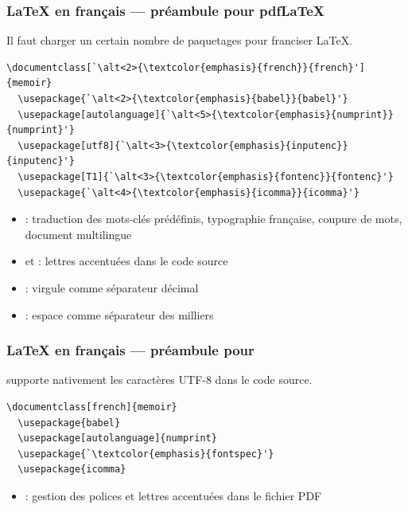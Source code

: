 \begin{frame}[fragile]
  \frametitle{{\LaTeX} en français --- préambule pour pdf{\LaTeX}}

  Il faut charger un certain nombre de paquetages pour franciser \LaTeX.
\begin{lstlisting}
\documentclass[`\alt<2>{\textcolor{emphasis}{french}}{french}']{memoir}
  \usepackage{`\alt<2>{\textcolor{emphasis}{babel}}{babel}'}
  \usepackage[autolanguage]{`\alt<5>{\textcolor{emphasis}{numprint}}{numprint}'}
  \usepackage[utf8]{`\alt<3>{\textcolor{emphasis}{inputenc}}{inputenc}'}
  \usepackage[T1]{`\alt<3>{\textcolor{emphasis}{fontenc}}{fontenc}'}
  \usepackage{`\alt<4>{\textcolor{emphasis}{icomma}}{icomma}'}
\end{lstlisting}
  \pause
  \begin{itemize}[<+->]
  \item {}: traduction des mots-clés prédéfinis,
    typographie française, coupure de mots, document multilingue
  \item {} et : lettres accentuées dans le
    code source
  \item {}: virgule comme séparateur décimal
  \item {}: espace comme séparateur des milliers
  \end{itemize}
\end{frame}

\begin{frame}[fragile]
  \frametitle{{\LaTeX} en français --- préambule pour {\XeLaTeX}}

  {\XeLaTeX} supporte nativement les caractères UTF-8 dans le code source.
\begin{lstlisting}
\documentclass[french]{memoir}
  \usepackage{babel}
  \usepackage[autolanguage]{numprint}
  \usepackage{`\textcolor{emphasis}{fontspec}'}
  \usepackage{icomma}
\end{lstlisting}
  \begin{itemize}
  \item {}: gestion des polices et lettres accentuées dans
    le fichier PDF
  \end{itemize}
\end{frame}

